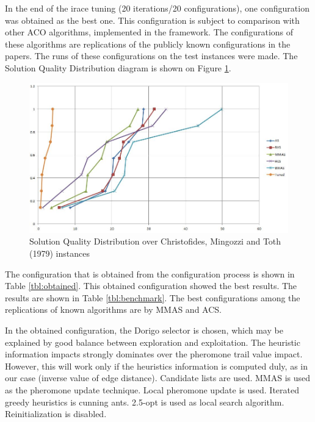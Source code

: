 \documentclass[12pt,a4paper,oneside]{book}
\begin{document}
In the end of the irace tuning (20 iterations/20 configurations), one configuration was obtained as the best one. This configuration is subject to comparison with other ACO algorithms, implemented in the framework. The configurations of these algorithms are replications of the publicly known configurations in the papers. The runs of these configurations on the test instances were made. The Solution Quality Distribution diagram is shown on Figure \ref{fig:sqd-cmt}.

\begin{figure}[h]
  \centering
    \includegraphics[scale=0.65]{sqd-benchmark.jpg}
  \caption{Solution Quality Distribution over Christofides, Mingozzi and Toth (1979) instances}
  \label{fig:sqd-cmt}
\end{figure}

The configuration that is obtained from the configuration process is shown in Table \ref{tbl:obtained}. This obtained configuration showed the best results. The results are shown in Table \ref{tbl:benchmark}. The best configurations among the replications of known algorithms are by MMAS and ACS.

In the obtained configuration, the Dorigo selector is chosen, which may be explained by good balance between exploration and exploitation. The heuristic information impacts strongly dominates over the pheromone trail value impact. However, this will work only if the heuristics information is computed duly, as in our case (inverse value of edge distance). Candidate lists are used. MMAS is used as the pheromone update technique. Local pheromone update is used. Iterated greedy heuristics is cunning ants. 2.5-opt is used as local search algorithm. Reinitialization is disabled.
\end{document}
